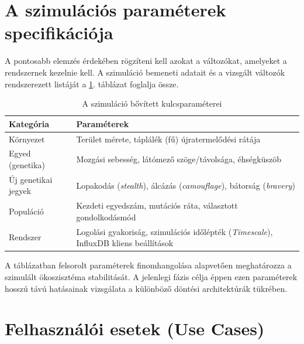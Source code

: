\section{A szimulációs paraméterek specifikációja}

A pontosabb elemzés érdekében rögzíteni kell azokat a változókat, amelyeket a rendszernek kezelnie kell. A szimuláció bemeneti adatait és a vizsgált változók rendszerezett listáját a \ref{table:parameters}. táblázat foglalja össze.

\begin{table}[h!]
\centering
\begin{tabular}{|l|p{10.5cm}|}
\hline
\textbf{Kategória} & \textbf{Paraméterek} \\ \hline
Környezet & Terület mérete, táplálék (fű) újratermelődési rátája \\ \hline
Egyed (genetika) & Mozgási sebesség, látómező szöge/távolsága, éhségküszöb \\ \hline
Új genetikai jegyek & Lopakodás (\textit{stealth}), álcázás (\textit{camouflage}), bátorság (\textit{bravery}) \\ \hline
Populáció & Kezdeti egyedszám, mutációs ráta, választott gondolkodásmód \\ \hline
Rendszer & Logolási gyakoriság, szimulációs időlépték (\textit{Timescale}), \newline InfluxDB kliens beállítások \\ \hline
\end{tabular}
\caption{A szimuláció bővített kulcsparaméterei}
\label{table:parameters}
\end{table}

A táblázatban felsorolt paraméterek finomhangolása alapvetően meghatározza a szimulált ökoszisztéma stabilitását. A jelenlegi fázis célja éppen ezen paraméterek hosszú távú hatásainak vizsgálata a különböző döntési architektúrák tükrében.

\section{Felhasználói esetek (Use Cases)}

